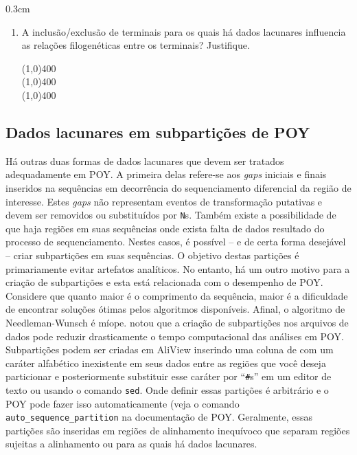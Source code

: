 \begin{refsection}
\begin {myindentpar}{0.3cm}
\begin{enumerate}[\itshape i.]
\begin{center}
\line(1,0){400}\\
\line(1,0){400}\\
\line(1,0){400}\\
\end{center}

	\item{A inclusão/exclusão de terminais para os quais há dados lacunares influencia as relações filogenéticas entre os terminais? Justifique.}

\begin{center}
\line(1,0){400}\\
\line(1,0){400}\\
\line(1,0){400}\\
\end{center}

\end{enumerate}
\end{myindentpar}

	\subsection{Dados lacunares em subpartições de POY}\label{tut11:missing:sub}

Há outras duas formas de dados lacunares que devem ser tratados adequadamente em POY. A primeira delas refere-se aos \textit{gaps} iniciais e finais inseridos na sequências em decorrência do sequenciamento diferencial da região de interesse. Estes \textit{gaps} não representam eventos de transformação putativas e devem ser removidos ou substituídos por \texttt{N}s. Também existe a possibilidade de que haja regiões em suas sequências onde exista falta de dados resultado do processo de sequenciamento. Nestes casos, é possível -- e de certa forma desejável -- criar subpartições em suas sequências. O objetivo destas partições é primariamente evitar artefatos analíticos. No entanto, há um outro motivo para a criação de subpartições e esta está relacionada com o desempenho de POY. Considere que quanto maior é o comprimento da sequência, maior é a dificuldade de encontrar soluções ótimas pelos algoritmos disponíveis. Afinal, o algoritmo de Needleman-Wunsch é míope. \textcite{Giribet_2001} notou que a criação de subpartições nos arquivos de dados pode reduzir drasticamente o tempo computacional das análises em POY. Subpartições podem ser criadas em AliView inserindo uma coluna de com um caráter alfabético inexistente em seus dados entre as regiões que você deseja particionar e posteriormente substituir esse caráter por ``\texttt{{\#}}s'' em um editor de texto ou usando o comando \texttt{sed}. Onde definir essas partições é arbitrário e o POY pode fazer isso automaticamente (veja o comando \texttt{auto\_sequence\_partition} na documentação de POY. Geralmente, essas partições são inseridas em regiões de alinhamento inequívoco que separam regiões sujeitas a alinhamento ou para as quais há dados lacunares.


\end{refsection}
